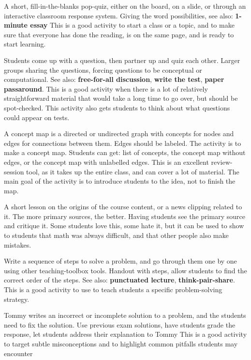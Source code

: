 {
{A short, fill-in-the-blanks 
pop-quiz, either on the board, on a slide, or through 
an interactive classroom response system.}
{Giving the word possibilities, see also: \textbf{1-minute essay}}
{This is a good activity to start a 
class or a topic, and to make sure that everyone 
has done the reading, is on the same page, 
and is ready to start learning.}

{Students come up with a question, 
then partner up and quiz each other.}
{Larger groups sharing the questions, forcing questions to be
conceptual or computational. See also: \textbf{free-for-all
discussion}, \textbf{write the test}, \textbf{paper passaround}.}
{This is a good activity when there is a lot 
of relatively straightforward material that would take a long 
time to go over, but should be spot-checked. This activity 
also gets students to think about what questions could appear 
on tests.}

{A concept map is a directed 
or undirected graph with concepts for nodes and 
edges for connections between them. Edges should be labeled. 
The activity is to make a concept map.}
{Students can get: list of concepts, 
the concept map without edges, or the concept map 
with unlabelled edges.}
{This is an excellent review-session 
tool, as it takes up the entire class, and can cover a 
lot of material. The main goal of the activity is to 
introduce students to the idea, not to finish the map.}

{A short lesson on the origins 
of the course content, or a news clipping related 
to it. The more primary sources, the better.}
{Having students see the 
primary source and critique it.}
{Some students love this, some hate 
it, but it can be used to show to students that math 
was always difficult, and that other people also 
make mistakes.}

{Write a sequence of steps to solve 
a problem, and go through them one by one using other 
teaching-toolbox tools.}
{Handout with steps, allow 
students to find the correct order of the steps. 
See also: \textbf{punctuated lecture}, 
\textbf{think-pair-share}.}
{This is a good activity to use 
to teach students a specific problem-solving strategy.}

{Tommy writes an incorrect or incomplete solution to a problem, 
and the students need to fix the solution.}
{Use previous exam solutions, have students grade the response, 
let students address their explanation to Tommy}
{This is a good activity to target subtle misconceptions and 
to highlight common pitfalls students may encounter}

}
